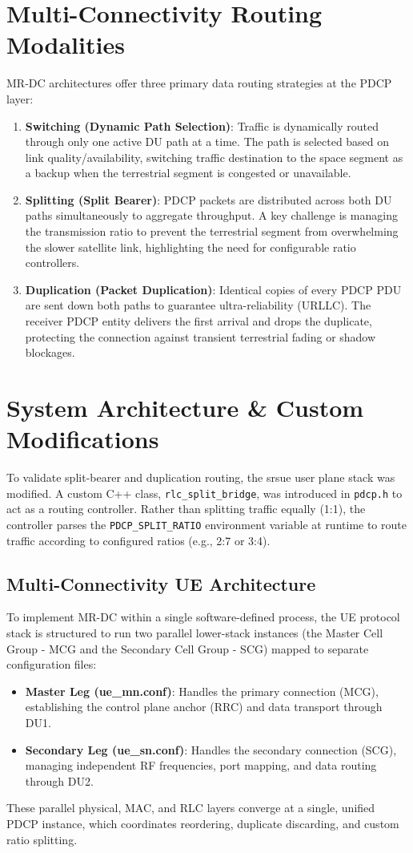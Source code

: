 \documentclass[conference]{IEEEtran}
\begin{document}
\section{Multi-Connectivity Routing Modalities}
MR-DC architectures offer three primary data routing strategies at the PDCP layer:
\begin{enumerate}
    \item \textbf{Switching (Dynamic Path Selection)}: Traffic is dynamically routed through only one active DU path at a time. The path is selected based on link quality/availability, switching traffic destination to the space segment as a backup when the terrestrial segment is congested or unavailable.
    \item \textbf{Splitting (Split Bearer)}: PDCP packets are distributed across both DU paths simultaneously to aggregate throughput. A key challenge is managing the transmission ratio to prevent the terrestrial segment from overwhelming the slower satellite link, highlighting the need for configurable ratio controllers.
    \item \textbf{Duplication (Packet Duplication)}: Identical copies of every PDCP PDU are sent down both paths to guarantee ultra-reliability (URLLC). The receiver PDCP entity delivers the first arrival and drops the duplicate, protecting the connection against transient terrestrial fading or shadow blockages.
\end{enumerate}

\section{System Architecture \& Custom Modifications}
To validate split-bearer and duplication routing, the srsue user plane stack was modified. A custom C++ class, \texttt{rlc\_split\_bridge}, was introduced in \texttt{pdcp.h} to act as a routing controller. Rather than splitting traffic equally (1:1), the controller parses the \texttt{PDCP\_SPLIT\_RATIO} environment variable at runtime to route traffic according to configured ratios (e.g., 2:7 or 3:4).

\subsection{Multi-Connectivity UE Architecture}
To implement MR-DC within a single software-defined process, the UE protocol stack is structured to run two parallel lower-stack instances (the Master Cell Group - MCG and the Secondary Cell Group - SCG) mapped to separate configuration files:
\begin{itemize}
    \item \textbf{Master Leg (ue\_mn.conf)}: Handles the primary connection (MCG), establishing the control plane anchor (RRC) and data transport through DU1.
    \item \textbf{Secondary Leg (ue\_sn.conf)}: Handles the secondary connection (SCG), managing independent RF frequencies, port mapping, and data routing through DU2.
\end{itemize}
These parallel physical, MAC, and RLC layers converge at a single, unified PDCP instance, which coordinates reordering, duplicate discarding, and custom ratio splitting.
\end{document}

